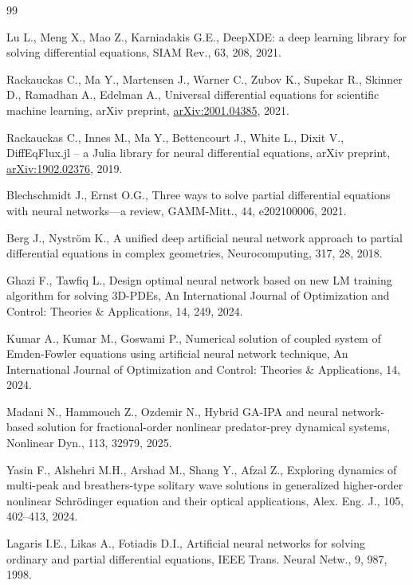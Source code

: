 \documentclass[10pt]{amsart}
\theoremstyle{definition}
\theoremstyle{remark}
\theoremstyle{plain}
\begin{document}
\begin{thebibliography}{99}

Lu L., Meng X., Mao Z., Karniadakis G.E., DeepXDE: a deep learning library for solving differential
equations, SIAM Rev., 63, 208, 2021.

Rackauckas C., Ma Y., Martensen J., Warner C., Zubov K., Supekar R., Skinner D., Ramadhan A.,
Edelman A., Universal differential equations for scientific machine learning, arXiv preprint,
\href{https://arxiv.org/abs/2001.04385}{arXiv:2001.04385}, 2021.

Rackauckas C., Innes M., Ma Y., Bettencourt J., White L., Dixit V., DiffEqFlux.jl -- a Julia library
for neural differential equations, arXiv preprint,
\href{https://arxiv.org/abs/1902.02376}{arXiv:1902.02376}, 2019.

Blechschmidt J., Ernst O.G., Three ways to solve partial differential equations with neural
networks---a review, GAMM-Mitt., 44, e202100006, 2021.

Berg J., Nystr\"om K., A unified deep artificial neural network approach to partial differential
equations in complex geometries, Neurocomputing, 317, 28, 2018.

Ghazi F., Tawfiq L., Design optimal neural network based on new LM training algorithm for solving
3D-PDEs, An International Journal of Optimization and Control: Theories \& Applications, 14, 249, 2024.

Kumar A., Kumar M., Goswami P., Numerical solution of coupled system of Emden-Fowler equations using
artificial neural network technique, An International Journal of Optimization and Control: Theories \&
Applications, 14, 2024.

Madani N., Hammouch Z., Ozdemir N., Hybrid GA-IPA and neural network-based solution for
fractional-order nonlinear predator-prey dynamical systems, Nonlinear Dyn., 113, 32979, 2025.

Yasin F., Alshehri M.H., Arshad M., Shang Y., Afzal Z., Exploring dynamics of multi-peak and
breathers-type solitary wave solutions in generalized higher-order nonlinear Schr\"odinger equation
and their optical applications, Alex. Eng. J., 105, 402--413, 2024.

Lagaris I.E., Likas A., Fotiadis D.I., Artificial neural networks for solving ordinary and partial
differential equations, IEEE Trans. Neural Netw., 9, 987, 1998.


\end{thebibliography}
\end{document}
